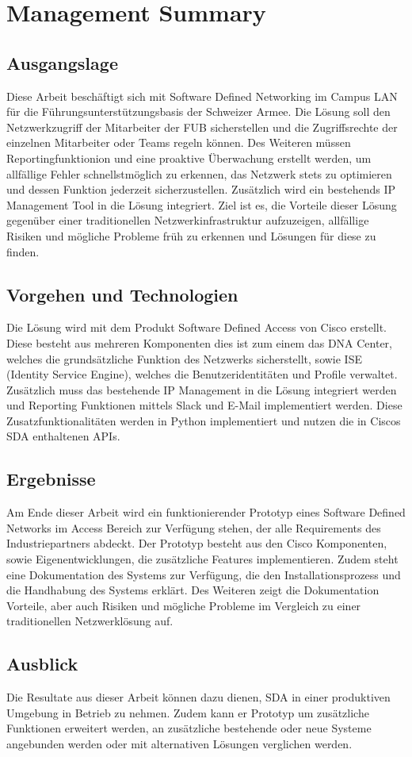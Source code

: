 \section{Management Summary}

\subsection{Ausgangslage}
Diese Arbeit beschäftigt sich mit Software Defined Networking im Campus LAN für die Führungsunterstützungsbasis der Schweizer Armee. Die Lösung soll den Netzwerkzugriff der Mitarbeiter der FUB sicherstellen und die Zugriffsrechte der einzelnen Mitarbeiter oder Teams regeln können. 
Des Weiteren müssen Reportingfunktionion und eine proaktive Überwachung erstellt werden, um allfällige Fehler schnellstmöglich zu erkennen, das Netzwerk stets zu optimieren und dessen Funktion jederzeit sicherzustellen.
Zusätzlich wird ein bestehends IP Management Tool in die Lösung integriert. 
Ziel ist es, die Vorteile dieser Lösung gegenüber einer traditionellen Netzwerkinfrastruktur aufzuzeigen, allfällige Risiken und mögliche Probleme früh zu erkennen und Lösungen für diese zu finden. 
\subsection{Vorgehen und Technologien}
Die Lösung wird mit dem Produkt Software Defined Access von Cisco erstellt. Diese besteht aus mehreren Komponenten dies ist zum einem das DNA Center, welches die grundsätzliche Funktion des Netzwerks sicherstellt, sowie ISE (Identity Service Engine), welches die Benutzeridentitäten und Profile verwaltet.
Zusätzlich muss das bestehende IP Management in die Lösung integriert werden und Reporting Funktionen mittels Slack und E-Mail implementiert werden. Diese Zusatzfunktionalitäten werden in Python implementiert und nutzen die in Ciscos SDA enthaltenen APIs.
\subsection{Ergebnisse}
Am Ende dieser Arbeit wird ein funktionierender Prototyp eines Software Defined Networks im Access Bereich zur Verfügung stehen, der alle Requirements des Industriepartners abdeckt. Der Prototyp besteht aus den Cisco Komponenten, sowie Eigenentwicklungen, die zusätzliche Features implementieren. 
Zudem steht eine Dokumentation des Systems zur Verfügung, die den Installationsprozess und die Handhabung des Systems erklärt. Des Weiteren zeigt die Dokumentation Vorteile, aber auch Risiken und mögliche Probleme im Vergleich zu einer traditionellen Netzwerklösung auf.
\subsection{Ausblick}
Die Resultate aus dieser Arbeit können dazu dienen, SDA in einer produktiven Umgebung in Betrieb zu nehmen. Zudem kann er Prototyp um zusätzliche Funktionen erweitert werden, an zusätzliche bestehende oder neue Systeme angebunden werden oder mit alternativen Lösungen verglichen werden.
